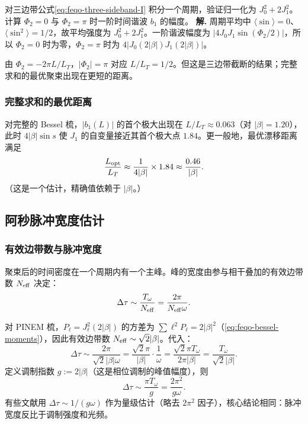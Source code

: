 \par
\begin{workedexample}
对三边带公式\cref{eq:feqo-three-sideband-I} 积分一个周期，验证归一化为 $J_0^2+2J_1^2$。计算 $\Phi_2=0$ 与 $\Phi_2=\pi$ 时一阶时间谐波 $b_1$ 的幅度。
\textbf{解.} 周期平均中 $\langle\sin\rangle=0$、$\langle\sin^2\rangle=1/2$，故平均强度为 $J_0^2+2J_1^2$。一阶谐波幅度为 $|4J_0J_1\sin(\Phi_2/2)|$，所以 $\Phi_2=0$ 时为零，$\Phi_2=\pi$ 时为 $4|J_0(2|\beta|)J_1(2|\beta|)|$。
\end{workedexample}
\par
由 $\Phi_2=-2\pi L/L_T$，$|\Phi_2|=\pi$ 对应 $L/L_T=1/2$。但这是三边带截断的结果；完整求和的最优聚束出现在更短的距离。

\subsubsection{完整求和的最优距离}

对完整的 Bessel 梳，$|b_1(L)|$ 的首个极大出现在 $L/L_T\approx 0.063$（对 $|\beta|=1.20$），此时 $4|\beta|\sin s$ 使 $J_1$ 的自变量接近其首个极大点 $1.84$。更一般地，最优漂移距离满足
\begin{equation}
\frac{L_{\rm opt}}{L_T}\approx\frac{1}{4|\beta|}\times 1.84\approx\frac{0.46}{|\beta|}.
\label{eq:feqo-optimal-drift}
\end{equation}
（这是一个估计，精确值依赖于 $|\beta|$。）

\subsection{阿秒脉冲宽度估计}

\subsubsection{有效边带数与脉冲宽度}

聚束后的时间密度在一个周期内有一个主峰。峰的宽度由参与相干叠加的有效边带数 $N_{\rm eff}$ 决定：
\begin{equation}
\Delta\tau\sim\frac{T_\omega}{N_{\rm eff}}=\frac{2\pi}{N_{\rm eff}\omega}.
\label{eq:feqo-pulse-width-estimate}
\end{equation}

对 PINEM 梳，$P_\ell=J_\ell^2(2|\beta|)$ 的方差为 $\sum\ell^2 P_\ell=2|\beta|^2$（\cref{eq:feqo-bessel-moments}），因此有效边带数 $N_{\rm eff}\sim\sqrt{2}|\beta|$。代入：
\begin{equation}
\Delta\tau\sim\frac{2\pi}{\sqrt{2}|\beta|\omega}=\frac{\sqrt{2}\pi}{|\beta|}\cdot\frac{1}{\omega}
=\frac{\sqrt{2}\pi T_\omega}{2\pi|\beta|}=\frac{T_\omega}{\sqrt{2}|\beta|}.
\label{eq:feqo-pulse-width-bessel}
\end{equation}
定义调制指数 $g:=2|\beta|$（这是相位调制的峰值幅度），则
\begin{equation}
\boxed{\Delta\tau\sim\frac{\pi T_\omega}{g}=\frac{2\pi^2}{g\omega}.}
\label{eq:feqo-pulse-width-g}
\end{equation}
有些文献用 $\Delta\tau\sim 1/(g\omega)$ 作为量级估计（略去 $2\pi^2$ 因子），核心结论相同：脉冲宽度反比于调制强度和光频。

